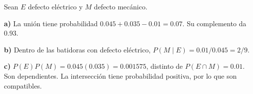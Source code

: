 Sean $E$ defecto eléctrico y $M$ defecto mecánico.

\textbf{a)} La unión tiene probabilidad $0.045+0.035-0.01=0.07$.
Su complemento da $\boxed{0.93}$.

\textbf{b)} Dentro de las batidoras con defecto eléctrico,
$P(M\mid E)=0.01/0.045=\boxed{2/9}$.

\textbf{c)} $P(E)P(M)=0.045(0.035)=0.001575$, distinto
de $P(E\cap M)=0.01$. Son dependientes. La intersección
tiene probabilidad positiva, por lo que son compatibles.
